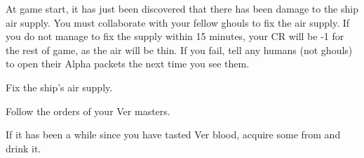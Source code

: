 \documentclass[blue]{guildcamp4}
\begin{document}
At game start, it has just been discovered that there has been damage to the ship air supply. You must collaborate with your fellow ghouls to fix the air supply. If you do not manage to fix the supply within 15 minutes, your CR will be -1 for the rest of game, as the air will be thin. If you fail, tell any humans (not ghouls) to open their Alpha packets the next time you see them.

\begin{itemz}[Goals]
	\item Fix the ship's air supply.
	\item Follow the orders of your Ver masters.
	\item If it has been a while since you have tasted Ver blood, acquire some from \cVone{} and drink it.
\end{itemz}

\begin{members}
	\member{\cJoan{}} 
	\member{\cJulie{}} 
	\member{\cJames{}} 
	\member{\cRasputin{}} 
\end{members}
\end{document}
